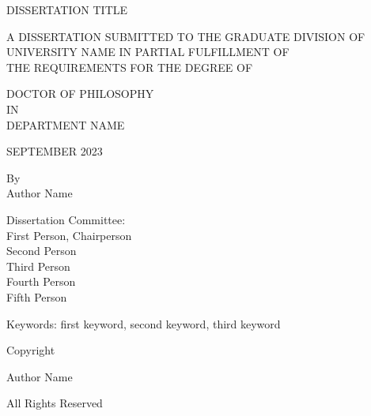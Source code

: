 \documentclass[
  12pt,
  letterpaper,
]{report}
\author{}
\date{}
\begin{document}

\begin{centering}

\vspace{3cm}

\doublespacing
DISSERTATION TITLE

\vspace{1.5cm}

\singlespacing
A DISSERTATION SUBMITTED TO THE GRADUATE DIVISION OF \\
UNIVERSITY NAME IN PARTIAL FULFILLMENT OF \\
THE REQUIREMENTS FOR THE DEGREE OF

\vspace{1cm}

\doublespacing
DOCTOR OF PHILOSOPHY \\
IN \\
DEPARTMENT NAME

\vspace{1.5cm}

\singlespacing
SEPTEMBER 2023

\vspace{1.5cm}

\doublespacing
By \\
Author Name

\vspace{1.5 cm}

\singlespacing
Dissertation Committee: \\
First Person, Chairperson \\
Second Person \\
Third Person \\
Fourth Person \\
Fifth Person

\vspace*{\fill}

\flushleft
Keywords: first keyword, second keyword, third keyword

\end{centering}

\newpage


\setcounter{page}{1}

\vspace*{\fill}

\begin{centering}

Copyright \textcopyright {}

\vspace{0.5 cm}

Author Name

All Rights Reserved

\end{centering}
\end{document}
